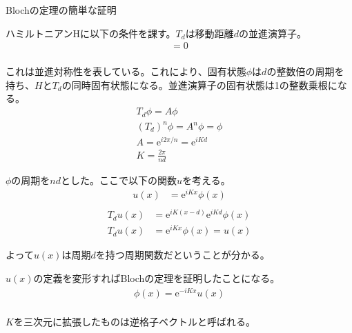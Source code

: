 \documentclass[a4paper, lualatex]{bxjsarticle}
\begin{document}
\begin{section}{Blochの定理の簡単な証明}
    \label{AppB}
    \par ハミルトニアンHに以下の条件を課す。$T_d$は移動距離$d$の並進演算子。
    \begin{align}
     [T_d,H]=0\nonumber\\
    \end{align}
    \par これは並進対称性を表している。これにより、固有状態$\phi$は$d$の整数倍の周期を持ち、$H$と$T_d$の同時固有状態になる。並進演算子の固有状態は1の整数乗根になる。
    \begin{align}
     T_d\phi=A\phi\nonumber\\
        (T_d)^n\phi=A^n\phi=\phi\nonumber\\
        A=\mathrm{e}^{i2\pi/n}=\mathrm{e}^{iKd}\nonumber\\
        K=\frac{2\pi}{n d}
    \end{align}
    \par $\phi$の周期を$nd$とした。ここで以下の関数$u$を考える。
    \begin{align}
     u(x) &= \mathrm{e}^{iKx}\phi(x)\label{ux}\nonumber\\
    \end{align}
    \begin{align}
     T_d u(x) &= \mathrm{e}^{iK(x-d)}\mathrm{e}^{iKd}\phi(x)\nonumber\\
        T_d u(x) &= \mathrm{e}^{iKx}\phi(x)=u(x)
    \end{align}
    \par よって$u(x)$は周期$d$を持つ周期関数だということが分かる。
    \par $u(x)$の定義を変形すればBlochの定理を証明したことになる。
    \begin{align}
     \phi(x) = \mathrm{e}^{-iKx}u(x)\nonumber\\
    \end{align}
    \par $K$を三次元に拡張したものは逆格子ベクトルと呼ばれる。
\end{section}
\end{document}
